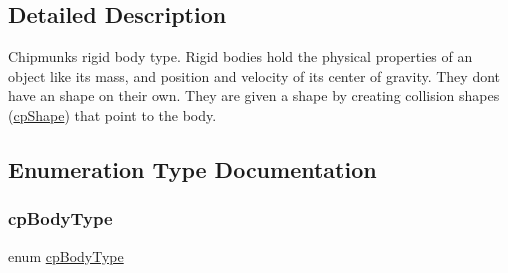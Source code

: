 \subsection{Detailed Description}
Chipmunk\textquotesingle{}s rigid body type. Rigid bodies hold the physical properties of an object like it\textquotesingle{}s mass, and position and velocity of it\textquotesingle{}s center of gravity. They don\textquotesingle{}t have an shape on their own. They are given a shape by creating collision shapes (\hyperlink{structcpShape}{cp\+Shape}) that point to the body. 

\subsection{Enumeration Type Documentation}
\mbox{\label{group__cpBody_ga3581b128fd3e2734952aeac8545fd5ca}} 
\subsubsection{\texorpdfstring{cp\+Body\+Type}{cpBodyType}\hspace{0.1cm}{\footnotesize\ttfamily [1/2]}}
{\footnotesize\ttfamily enum \hyperlink{group__cpBody_ga3581b128fd3e2734952aeac8545fd5ca}{cp\+Body\+Type}}

